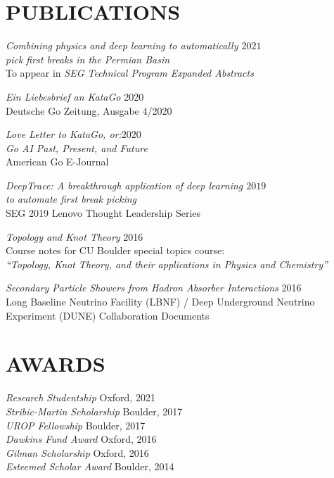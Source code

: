 \documentclass[margin]{res}
\begin{document}
\begin{resume}
\section{PUBLICATIONS} {\sl Combining physics and deep learning to automatically \hfill            $2021$ \\ pick first breaks in the Permian Basin} \\
		To appear in {\sl SEG Technical Program Expanded Abstracts}

                {\sl Ein Liebesbrief an KataGo} \hfill 2020 \\
                Deutsche Go Zeitung, Ausgabe 4/2020

                {\sl Love Letter to KataGo, or:\hfill $2020$\\ Go AI Past, Present, and Future} \\
                American Go E-Journal
                
                {\sl DeepTrace: A breakthrough application of deep learning \hfill $2019$\\ to automate first break picking}  \\
                SEG 2019 Lenovo Thought Leadership Series

                {\sl Topology and Knot Theory} \hfill 2016 \\
                Course notes for CU Boulder special topics course: \\
                \textit{``Topology, Knot Theory, and their applications in Physics and Chemistry''}
                
                {\sl Secondary Particle Showers from Hadron Absorber Interactions} \hfill 2016 \\
                Long Baseline Neutrino Facility (LBNF) / Deep Underground Neutrino Experiment (DUNE) Collaboration Documents

                
                \section{AWARDS}
                
                {\sl Research Studentship} \hfill Oxford, 2021 \\
                {\sl Stribic-Martin Scholarship} \hfill Boulder, 2017 \\
                        {\sl UROP Fellowship} \hfill Boulder, 2017 \\
                        {\sl Dawkins Fund Award} \hfill Oxford, 2016 \\
                        {\sl Gilman Scholarship} \hfill Oxford, 2016 \\
                        {\sl Esteemed Scholar Award} \hfill Boulder, 2014 \\




                

\end{resume}
\end{document}
